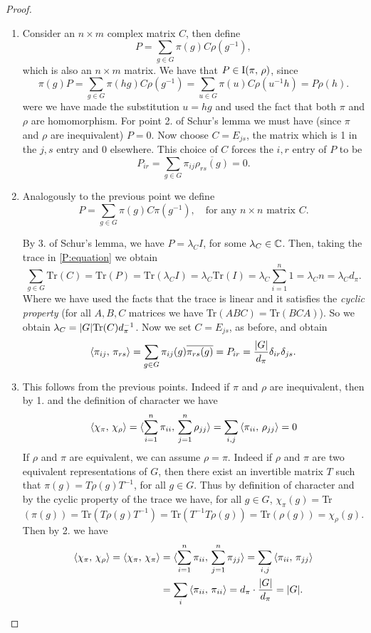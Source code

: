 \begin{proof}~ 
\begin{enumerate}
\item Consider an $n\times m$ complex matrix $C$, then define
\begin{equation*}
P=\sum_{g\in G}\pi(g)C\rho(g^{-1}),
\end{equation*}
which is also an $n\times m$ matrix. We have that $P\in \operatorname{I}(\pi, \, \rho)$, since
\[
\pi(g)P=\sum_{g \in G}\pi(hg)C\rho(g^{-1})=\sum_{u\in G}\pi(u)C\rho(u^{-1}h)=P\rho(h).
\]
were we have made the substitution $u=hg$ and  used the fact that both $\pi$ and $\rho$ are homomorphism. For point 2. of Schur's lemma we must have (since $\pi$ and $\rho$ are inequivalent) $P=0$. Now choose $C=E_{js}$, the matrix which is 1 in the $j,s$ entry and 0 elsewhere. This choice of $C$ forces the $i,r$ entry of $P$ to be 
\[
P_{ir}=\sum_{g\in G}\pi_{ij}\overline{\rho_{rs}(g)}=0.
\]
\item Analogously to the previous point we define 
\begin{equation}
\label{P:equation}
P=\sum_{g\in G}\pi(g)C\pi(g^{-1}), \quad \text{for any $n\times n$ matrix $C$.}
\end{equation}

By 3. of Schur's lemma, we have $P=\lambda_CI$, for some $\lambda_C\in {\mathbb C}$. Then, taking the trace in \ref{P:equation} we obtain
\[
\text{$\sum_{g\in G}$Tr$(C)=$Tr$(P)=$Tr$(\lambda_CI)=\lambda_C$Tr$(I)=\lambda_C\sum_{i=1}^n 1=\lambda_Cn=\lambda_Cd_\pi.$}
\]  
Where we have used the facts that the trace is linear and it satisfies the \emph{cyclic property} (for all $A,B,C$ matrices we have Tr$(ABC)=$Tr$(BCA)$). So we obtain $\lambda_C=\lvert G\rvert \text{Tr$(C)d_\pi^{-1}$}$. Now we set $C=E_{js}$, as before, and obtain 
\[
\braket{\pi_{ij},\, \pi_{rs}}=\sum_{g\in G}\pi_{ij}(g)\overline{\pi_{rs}(g)}=P_{ir}=\frac{\lvert G\rvert}{d_\pi}\delta_{ir}\delta_{js}.
\]
\item This follows from the previous points. Indeed if $\pi$ and $\rho$ are inequivalent, then by 1. and the definition of character we have
\[
\braket{\chi_\pi,\, \chi_\rho}=\braket{\sum_{i=1}^n\pi_{ii},\, \sum_{j=1}^n\rho_{jj} }=\sum_{i,j}\braket{\pi_{ii},\, \rho_{jj} }=0
\]
If $\rho$ and $\pi$ are equivalent, we can assume $\rho=\pi$. Indeed if $\rho$ and $\pi$ are two equivalent representations of $G$, then there exist  an invertible matrix $T$ such that $\pi(g)=T\rho(g)T^{-1}$, for all $g\in G$. Thus by definition of character and by the cyclic property of the trace we have, for all $g\in G$, $\chi_\pi(g)=$Tr$(\pi(g))=$Tr$(T\rho(g)T^{-1})=$Tr$(T^{-1}T\rho(g))= $Tr$(\rho(g))=\chi_\rho(g)$. Then by 2. we have
\[
\begin{split}
\braket{\chi_\pi,\, \chi_\rho}=\braket{\chi_\pi,\, \chi_\pi}&=\braket{\sum_{i=1}^n\pi_{ii},\, \sum_{j=1}^n\pi_{jj} }=\sum_{i,j}\braket{\pi_{ii},\, \pi_{jj} }\\
&=\sum_{i}\braket{\pi_{ii},\, \pi_{ii} }=d_\pi\cdot\frac{\lvert G\rvert}{d_\pi}=\lvert G\rvert.
\end{split}
\]
\end{enumerate}
\end{proof}
